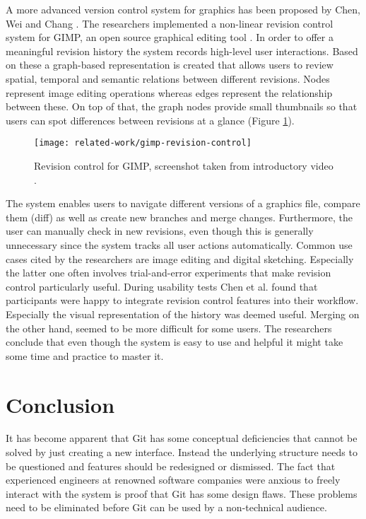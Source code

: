 A more advanced version control system for graphics has been proposed by Chen, Wei and Chang \cite{chen_nonlinear_2011}. The researchers implemented a non-linear revision control system for GIMP, an open source graphical editing tool \cite{_gimp_????}. In order to offer a meaningful revision history the system records high-level user interactions. Based on these a graph-based representation is created that allows users to review spatial, temporal and semantic relations between different revisions. Nodes represent image editing operations whereas edges represent the relationship between these. On top of that, the graph nodes provide small thumbnails so that users can spot differences between revisions at a glance (Figure \ref{fig:gimp-rev-control}).

\begin{figure}[h!]
 \centering
 \texttt{[image: related-work/gimp-revision-control]}
 \caption{Revision control for GIMP, screenshot taken from introductory video \cite{_nonlinear_????}.}
 \label{fig:gimp-rev-control}
\end{figure}


The system enables users to navigate different versions of a graphics file, compare them (diff) as well as create new branches and merge changes. Furthermore, the user can manually check in new revisions, even though this is generally unnecessary since the system tracks all user actions automatically. Common use cases cited by the researchers are image editing and digital sketching. Especially the latter one often involves trial-and-error experiments that make revision control particularly useful. During usability tests Chen et al. found that participants were happy to integrate revision control features into their workflow. Especially the visual representation of the history was deemed useful. Merging on the other hand, seemed to be more difficult for some users. The researchers conclude that even though the system is easy to use and helpful it might take some time and practice to master it.

\section{Conclusion}
It has become apparent that Git has some conceptual deficiencies that cannot be solved by just creating a new interface. Instead the underlying structure needs to be questioned and features should be redesigned or dismissed. The fact that experienced engineers at renowned software companies were anxious to freely interact with the system is proof that Git has some design flaws. These problems need to be eliminated before Git can be used by a non-technical audience.

